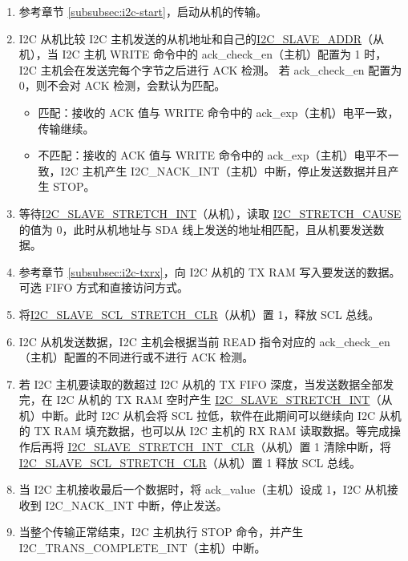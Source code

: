 \documentclass[main\_\_CN.tex]{subfiles}
\begin{document}
\begin{enumerate}
\item 参考章节 \ref{subsubsec:i2c-start}，启动从机的传输。
\item I2C 从机比较 I2C 主机发送的从机地址和自己的\hyperref[fielddesc:I2CSLAVEADDR]{I2C\_SLAVE\_ADDR}（从机），当 I2C 主机 WRITE 命令中的 ack\_check\_en（主机）配置为 1 时，I2C 主机会在发送完每个字节之后进行 ACK 检测。 若 ack\_check\_en 配置为 0，则不会对 ACK 检测，会默认为匹配。
\begin{itemize}
\item 匹配：接收的 ACK 值与 WRITE 命令中的 ack\_exp（主机）电平一致，传输继续。
\item 不匹配：接收的 ACK 值与 WRITE 命令中的 ack\_exp（主机）电平不一致，I2C 主机产生 I2C\_NACK\_INT（主机）中断，停止发送数据并且产生 STOP。
\end{itemize}

\item 等待\hyperref[int:i2c-slave-stretch]{I2C\_SLAVE\_STRETCH\_INT}（从机），读取 \hyperref[fielddesc:I2CSTRETCHCAUSE]{I2C\_STRETCH\_CAUSE} 的值为 0，此时从机地址与 SDA 线上发送的地址相匹配，且从机要发送数据。
\item 参考章节 \ref{subsubsec:i2c-txrx}，向 I2C 从机的 TX RAM 写入要发送的数据。可选 FIFO 方式和直接访问方式。
\item 将\hyperref[fielddesc:I2CSLAVESCLSTRETCHCLR]{I2C\_SLAVE\_SCL\_STRETCH\_CLR}（从机）置 1，释放 SCL 总线。

\item I2C 从机发送数据，I2C 主机会根据当前 READ 指令对应的 ack\_check\_en（主机）配置的不同进行或不进行 ACK 检测。

\item 若 I2C 主机要读取的数超过 I2C 从机的 TX FIFO 深度，当发送数据全部发完，在 I2C 从机的 TX RAM 空时产生 \hyperref[int:i2c-slave-stretch]{I2C\_SLAVE\_STRETCH\_INT}（从机）中断。此时 I2C 从机会将 SCL 拉低，软件在此期间可以继续向 I2C 从机的 TX RAM 填充数据，也可以从 I2C 主机的 RX RAM 读取数据。等完成操作后再将 \hyperref[fielddesc:I2CSLAVESTRETCHINTCLR]{I2C\_SLAVE\_STRETCH\_INT\_CLR}（从机）置 1 清除中断，将 \hyperref[fielddesc:I2CSLAVESCLSTRETCHCLR]{I2C\_SLAVE\_SCL\_STRETCH\_CLR}（从机）置 1 释放 SCL 总线。

\item 当 I2C 主机接收最后一个数据时，将 ack\_value（主机）设成 1，I2C 从机接收到 I2C\_NACK\_INT 中断，停止发送。

\item 当整个传输正常结束，I2C 主机执行 STOP 命令，并产生 I2C\_TRANS\_COMPLETE\_INT（主机）中断。

\end{enumerate}
\end{document}

